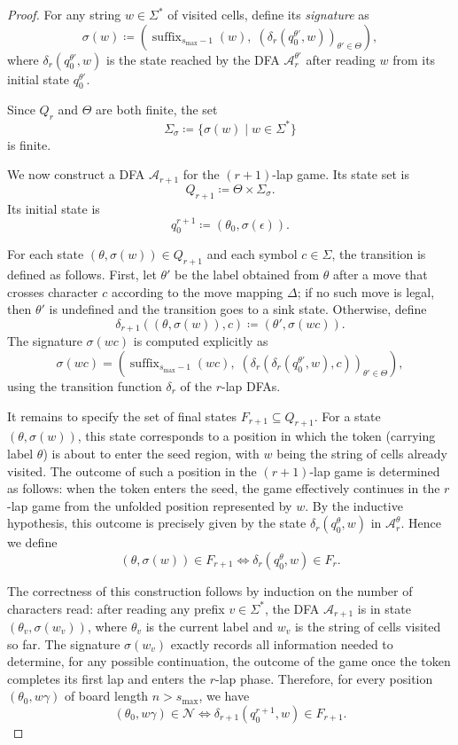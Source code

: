\documentclass[11pt]{article}
\theoremstyle{definition}
\theoremstyle{plain}
\begin{document}
\begin{proof}
For any string $w \in \Sigma^*$ of visited cells, define its \textit{signature} as
\[
\sigma(w) \coloneqq \left( \operatorname{suffix}_{s_{\max}-1}(w),\;
\left( \delta_r(q_0^{\theta'}, w) \right)_{\theta' \in \Theta} \right),
\]
where $\delta_r(q_0^{\theta'}, w)$ is the state reached by the DFA $\mathcal{A}_r^{\theta'}$ after reading $w$ from its initial state $q_0^{\theta'}$.

Since $Q_r$ and $\Theta$ are both finite, the set
\[
\Sigma_{\sigma} \coloneqq \{ \sigma(w) \mid w \in \Sigma^* \}
\]
is finite.

We now construct a DFA $\mathcal{A}_{r+1}$ for the $(r+1)$-lap game. Its state set is
\[
Q_{r+1} \coloneqq \Theta \times \Sigma_{\sigma}.
\]
Its initial state is
\[
q_0^{r+1} \coloneqq (\theta_0, \sigma(\epsilon)).
\]

For each state $(\theta, \sigma(w)) \in Q_{r+1}$ and each symbol $c \in \Sigma$, the transition is defined as follows. First, let $\theta'$ be the label obtained from $\theta$ after a move that crosses character $c$ according to the move mapping $\Delta$; if no such move is legal, then $\theta'$ is undefined and the transition goes to a sink state. Otherwise, define
\[
\delta_{r+1}((\theta, \sigma(w)), c) \coloneqq (\theta', \sigma(wc)).
\]
The signature $\sigma(wc)$ is computed explicitly as
\[
\sigma(wc) = \left( \operatorname{suffix}_{s_{\max}-1}(wc),\;
\left( \delta_r(\delta_r(q_0^{\theta'}, w), c) \right)_{\theta' \in \Theta} \right),
\]
using the transition function $\delta_r$ of the $r$-lap DFAs.

It remains to specify the set of final states $F_{r+1} \subseteq Q_{r+1}$. For a state $(\theta, \sigma(w))$, this state corresponds to a position in which the token (carrying label $\theta$) is about to enter the seed region, with $w$ being the string of cells already visited. The outcome of such a position in the $(r+1)$-lap game is determined as follows: when the token enters the seed, the game effectively continues in the $r$-lap game from the unfolded position represented by $w$. By the inductive hypothesis, this outcome is precisely given by the state $\delta_r(q_0^{\theta}, w)$ in $\mathcal{A}_r^{\theta}$. Hence we define
\[
(\theta, \sigma(w)) \in F_{r+1}
\iff
\delta_r(q_0^{\theta}, w) \in F_r.
\]

The correctness of this construction follows by induction on the number of characters read: after reading any prefix $v \in \Sigma^*$, the DFA $\mathcal{A}_{r+1}$ is in state $(\theta_v, \sigma(w_v))$, where $\theta_v$ is the current label and $w_v$ is the string of cells visited so far. The signature $\sigma(w_v)$ exactly records all information needed to determine, for any possible continuation, the outcome of the game once the token completes its first lap and enters the $r$-lap phase. Therefore, for every position $(\theta_0, w\gamma)$ of board length $n > s_{\max}$, we have
\[
(\theta_0, w\gamma) \in \mathcal{N}
\iff
\delta_{r+1}(q_0^{r+1}, w) \in F_{r+1}.
\]


\end{proof}
\end{document}
